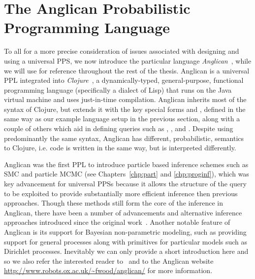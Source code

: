 
\section{The Anglican Probabilistic Programming Language}
\label{sec:probprog:anglican}

To all for a more precise consideration of issues associated with designing and using a universal
PPS, we now introduce the particular language \emph{Anglican}~\citep{wood2014new,tolpin2016design},
while we will use for reference throughout the rest of the thesis.  
Anglican is a universal PPL integrated into \emph{Clojure}~\citep{hickey2008clojure}, a dynamically-typed, general-purpose, functional
programming language (specifically a dialect of Lisp) that runs on the Java virtual machine and uses just-in-time compilation.
Anglican inherits most of the syntax of Clojure, but extends it with the key
special forms \sample and \observe \citep{tolpin2015probabilistic,tolpin2016design}, defined in the same way as
our example language setup in the previous section, along with a couple of others which aid in defining queries
such as \mem, \store, and \retrieve.  Despite using predominantly the same syntax, Anglican has different, 
probabilistic, semantics to Clojure, i.e. code is written in the same way, but is interpreted differently.

Anglican was the first PPL to introduce particle based 
inference schemes such as SMC and particle MCMC (see Chapters~\ref{chp:part} and \ref{chp:proginf}), which was
key advancement for universal PPSs because it allows the structure of the query to be exploited to provide
substantially more efficient inference then previous approaches.  Though these methods still form the core
of the inference in Anglican, there have been a number of advancements and alternative inference approaches introduced since
the original work~\citep{paige2014asynchronous,tolpin-socs-2015,tolpin2015output,vandemeent_aistats_2015,
	rainforth2016interacting,rainforth2016bayesian,le2017inference}.  Another notable feature of Anglican is its
support for Bayesian non-parametric modeling, such as providing support for general processes along with
primitives for particular models such as Dirichlet processes.  Inevitably we can only provide a short 
introduction here and so we also refer the interested reader to~\cite{tolpin2016design} and to the Anglican website {\small\url{http://www.robots.ox.ac.uk/~fwood/anglican/}} for more information.

